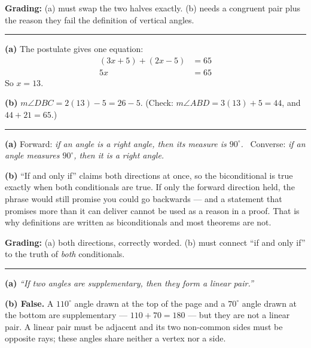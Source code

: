 \documentclass[12pt]{article}
\begin{document}
\textbf{Grading:} (a) must swap the two halves exactly. (b) needs a congruent pair plus the reason they fail the definition of vertical angles.

\vspace{0.2cm}\noindent\rule{\linewidth}{0.2pt}


\textbf{(a)} The postulate gives one equation:
\begin{align*}
  (3x + 5) + (2x - 5) &= 65 \\
  5x &= 65
\end{align*}
So $x = 13$. 

\textbf{(b)} $m\angle DBC = 2(13) - 5 = 26 - 5$. (Check: $m\angle ABD = 3(13) + 5 = 44$, and $44 + 21 = 65$.) 

\vspace{0.2cm}\noindent\rule{\linewidth}{0.2pt}


\textbf{(a)} Forward: \emph{if an angle is a right angle, then its measure is $90^\circ$.} \ Converse: \emph{if an angle measures $90^\circ$, then it is a right angle.}

\textbf{(b)} ``If and only if'' claims both directions at once, so the biconditional is true exactly when both conditionals are true. If only the forward direction held, the phrase would still promise you could go backwards --- and a statement that promises more than it can deliver cannot be used as a reason in a proof. That is why definitions are written as biconditionals and most theorems are not.

\textbf{Grading:} (a) both directions, correctly worded. (b) must connect ``if and only if'' to the truth of \emph{both} conditionals.

\vspace{0.2cm}\noindent\rule{\linewidth}{0.2pt}


\textbf{(a)} \emph{``If two angles are supplementary, then they form a linear pair.''}

\textbf{(b) False.} A $110^\circ$ angle drawn at the top of the page and a $70^\circ$ angle drawn at the bottom are supplementary --- $110 + 70 = 180$ --- but they are not a linear pair. A linear pair must be adjacent and its two non-common sides must be opposite rays; these angles share neither a vertex nor a side.
\end{document}
